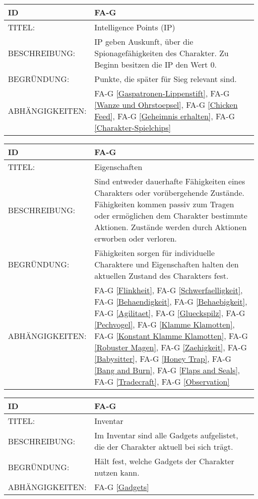 \begin{tabularx}{16cm}{l|X}
	{table}\label{IP}
	\textbf{ID} & \textbf{FA-G \arabic{table}} \\
	\hline
	TITEL: & Intelligence Points (IP) \\
	\hline
	BESCHREIBUNG: & IP geben Auskunft, über die Spionagefähigkeiten des Charakter. Zu Beginn besitzen die IP den Wert 0.\\
	\hline
	BEGRÜNDUNG: & Punkte, die später für Sieg relevant sind.\\
	\hline
	ABHÄNGIGKEITEN: & FA-G \ref{Gaspatronen-Lippenstift}, FA-G \ref{Wanze und Ohrstoepsel}, FA-G \ref{Chicken Feed}, FA-G \ref{Geheimnis erhalten}, FA-G \ref{Charakter-Spielchips} \\
\end{tabularx}


\begin{tabularx}{16cm}{l|X}
	{table}\label{Eigenschaften}
	\textbf{ID} & \textbf{FA-G \arabic{table}} \\
	\hline
	TITEL: & Eigenschaften \\
	\hline
	BESCHREIBUNG: & Sind entweder dauerhafte Fähigkeiten eines Charakters oder vorübergehende Zustände. Fähigkeiten kommen passiv zum Tragen oder ermöglichen dem Charakter bestimmte Aktionen. Zustände werden durch Aktionen erworben oder verloren.\\
	\hline
	BEGRÜNDUNG: & Fähigkeiten sorgen für individuelle Charaktere und Eigenschaften halten den aktuellen Zustand des Charakters fest. \\
	\hline
	ABHÄNGIGKEITEN: & FA-G \ref{Flinkheit}, FA-G \ref{Schwerfaelligkeit}, FA-G \ref{Behaendigkeit}, FA-G \ref{Behaebigkeit}, FA-G \ref{Agilitaet}, FA-G \ref{Glueckspilz}, FA-G \ref{Pechvogel}, FA-G \ref{Klamme Klamotten}, FA-G \ref{Konstant Klamme Klamotten}, FA-G \ref{Robuster Magen}, FA-G \ref{Zaehigkeit}, FA-G \ref{Babysitter}, FA-G \ref{Honey Trap}, FA-G \ref{Bang and Burn}, FA-G \ref{Flaps and Seals}, FA-G \ref{Tradecraft}, FA-G \ref{Observation} \\
\end{tabularx}

\begin{tabularx}{16cm}{l|X}
	{table}\label{Inventar}
	\textbf{ID} & \textbf{FA-G \arabic{table}} \\
	\hline
	TITEL: & Inventar \\
	\hline
	BESCHREIBUNG: & Im Inventar sind alle Gadgets aufgelistet, die der Charakter aktuell bei sich trägt.\\
	\hline
	BEGRÜNDUNG: & Hält fest, welche Gadgets der Charakter nutzen kann.\\
	\hline
	ABHÄNGIGKEITEN: & FA-G \ref{Gadgets}\\
\end{tabularx}

